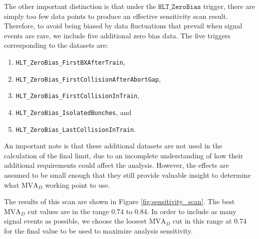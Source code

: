 The other important distinction is that under the $\texttt{HLT\_ZeroBias}$ trigger, there are simply too few data points to produce an effective sensitivity scan result. Therefore, to avoid being biased by data fluctuations that prevail when signal events are rare, we include five additional zero bias data. The five triggers corresponding to the datasets are:
\begin{enumerate}
    \item \texttt{HLT\_ZeroBias\_FirstBXAfterTrain},
    \item \texttt{HLT\_ZeroBias\_FirstCollisionAfterAbortGap},
    \item \texttt{HLT\_ZeroBias\_FirstCollisionInTrain},
    \item \texttt{HLT\_ZeroBias\_IsolatedBunches}, and
    \item \texttt{HLT\_ZeroBias\_LastCollisionInTrain}.
\end{enumerate}
An important note is that these additional datasets are not used in the calculation of the final limit, due to an incomplete understanding of how their additional requirements could affect the analysis. However, the effects are assumed to be small enough that they still provide valuable insight to determine what $\text{MVA}_D$ working point to use. 

The results of this scan are shown in Figure \ref{fig:sensitivity_scan}. The best $\text{MVA}_D$ cut values are in the range 0.74 to 0.84. In order to include as many signal events as possible, we choose the loosest $\text{MVA}_D$ cut in this range at $0.74$ for the final value to be used to maximize analysis sensitivity. 

